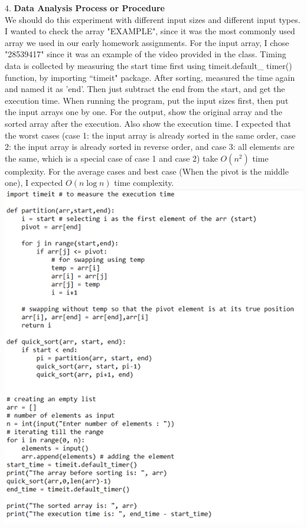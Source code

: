 \documentclass{article}
\begin{document}
4. \textbf{Data Analysis Process or Procedure} \\
\indent We should do this experiment with different input sizes and different input types. I wanted to check the array "EXAMPLE", since it was the most commonly used array we used in our early homework assignments. For the input array, I chose "28539417" since it was an example of the video provided in the class. Timing data is collected by measuring the start time first using timeit.default\_ timer() function, by importing ``timeit" package. After sorting, measured the time again and named it as 'end'. Then just subtract the end from the start, and get the execution time. When running the program, put the input sizes first, then put the input arrays one by one. For the output, show the original array and the sorted array after the execution. Also show the execution time. I expected that the worst cases (case 1: the input array is already sorted in the same order, case 2: the input array is already sorted in reverse order, and case 3: all elements are the same, which is a special case of case 1 and case 2) take $O(n^2)$ time complexity. For the average cases and best case (When the pivot is the middle one), I expected $O(n\log n)$ time complexity.\\
\includegraphics[scale = 0.8]{sourcecode}
\end{document}
